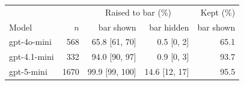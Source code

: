 \begin{tabular}{lrrrr}
\toprule
 & & \multicolumn{2}{c}{Raised to bar (\%)} & Kept (\%) \\
Model & $n$ & bar shown & bar hidden & bar shown \\
\midrule
gpt-4o-mini & 568 & 65.8 [61, 70] & 0.5 [0, 2] & 65.1 \\
gpt-4.1-mini & 332 & 94.0 [90, 97] & 0.9 [0, 3] & 93.7 \\
gpt-5-mini & 1670 & 99.9 [99, 100] & 14.6 [12, 17] & 95.5 \\
\bottomrule
\end{tabular}

